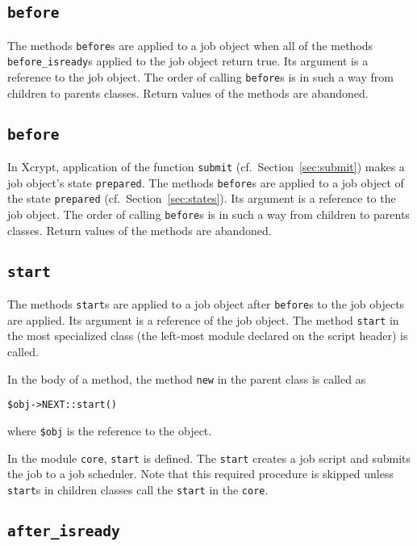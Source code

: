 \documentclass[a4paper,10pt]{report}
\def\|{\verb|} %|
\begin{document}
\subsection{\texttt{before}}

The methods \texttt{before}s are applied to a job object when all of
the methods \texttt{before\_isready}s applied to the job object return
true.  Its argument is a reference to the job object.  The order of calling
\texttt{before}s is in such a way from children to parents
classes.  Return values of the methods are abandoned.
\fi

\subsection{\texttt{before}}

In Xcrypt, application of the function \|submit| (cf.\
Section~\ref{sec:submit}) makes a job object's state \|prepared|.  The
methods \texttt{before}s are applied to a job object of the state
\|prepared| (cf.\ Section~\ref{sec:states}).  Its argument is a
reference to the job object.  The order of calling \texttt{before}s is
in such a way from children to parents classes.  Return values of the
methods are abandoned.

\subsection{\texttt{start}}

The methods \texttt{start}s are applied to a job object after
\texttt{before}s to the job objects are applied.  Its argument is a
reference of the job object.  The method \|start| in the most
specialized class (the left-most module declared on the script header)
is called.

In the body of a method, the method \|new| in the parent class is
called as
\begin{center}
 \|$obj->NEXT::start()|
\end{center}
where \|$obj| is the reference to the object.

In the module \|core|, \|start| is defined.  The \|start| creates a
job script and submits the job to a job scheduler.  Note that this
required procedure is skipped unless \|start|s in children classes call
the \|start| in the \|core|.

\subsection{\texttt{after\_isready}}
\end{document}
